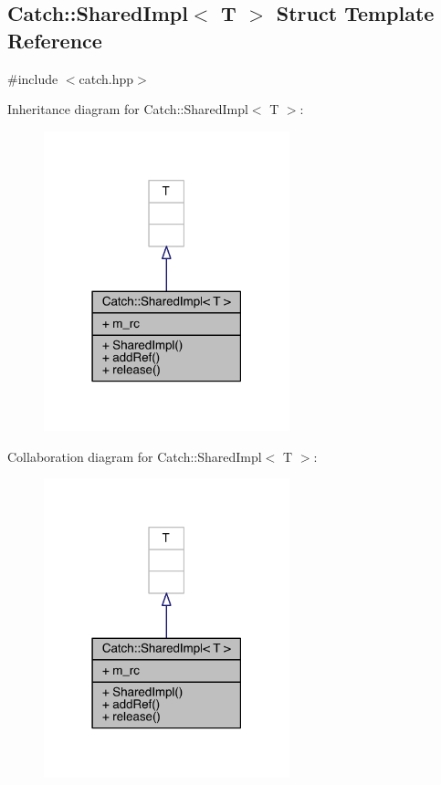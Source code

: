 \hypertarget{a00074}{}\subsection{Catch\+:\+:Shared\+Impl$<$ T $>$ Struct Template Reference}
\label{a00074}


{\ttfamily \#include $<$catch.\+hpp$>$}



Inheritance diagram for Catch\+:\+:Shared\+Impl$<$ T $>$\+:\nopagebreak
\begin{figure}[H]
\begin{center}
\leavevmode
\includegraphics[width=202pt]{a00265}
\end{center}
\end{figure}


Collaboration diagram for Catch\+:\+:Shared\+Impl$<$ T $>$\+:\nopagebreak
\begin{figure}[H]
\begin{center}
\leavevmode
\includegraphics[width=202pt]{a00266}
\end{center}
\end{figure}
